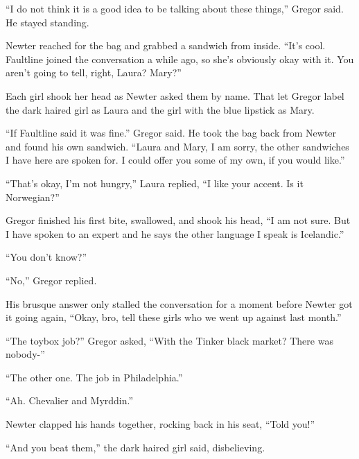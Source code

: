 ``I do not think it is a good idea to be talking about these things,'' Gregor said.  He stayed standing.



Newter reached for the bag and grabbed a sandwich from inside.  ``It's cool.  Faultline joined the conversation a while ago, so she's obviously okay with it.  You aren't going to tell, right, Laura?  Mary?''



Each girl shook her head as Newter asked them by name.  That let Gregor label the dark haired girl as Laura and the girl with the blue lipstick as Mary.



``If Faultline said it was fine.'' Gregor said.  He took the bag back from Newter and found his own sandwich.  ``Laura and Mary, I am sorry, the other sandwiches I have here are spoken for.  I could offer you some of my own, if you would like.''



``That's okay, I'm not hungry,'' Laura replied, ``I like your accent.  Is it Norwegian?''



Gregor finished his first bite, swallowed, and shook his head, ``I am not sure.   But I have spoken to an expert and he says the other language I speak is Icelandic.''



``You don't know?''



``No,'' Gregor replied.



His brusque answer only stalled the conversation for a moment before Newter got it going again, ``Okay, bro, tell these girls who we went up against last month.''



``The toybox job?'' Gregor asked, ``With the Tinker black market?  There was nobody-''



``The other one.  The job in Philadelphia.''



``Ah.  Chevalier and Myrddin.''



Newter clapped his hands together, rocking back in his seat, ``Told you!''



``And you beat them,'' the dark haired girl said, disbelieving.



